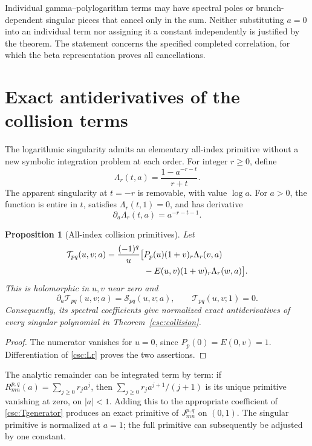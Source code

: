 \documentclass[11pt,a4paper]{article}
\numberwithin{equation}{section}
\newtheorem{proposition}[theorem]{Proposition}
\theoremstyle{definition}
\begin{document}
Individual gamma--polylogarithm terms may have spectral poles or branch-dependent singular pieces that cancel only in the sum. Neither substituting $a=0$ into an individual term nor assigning it a constant independently is justified by the theorem. The statement concerns the specified completed correlation, for which the beta representation proves all cancellations.

\section{Exact antiderivatives of the collision terms}\label{csc:antiderivatives}
The logarithmic singularity admits an elementary all-index primitive without a new symbolic integration problem at each order. For integer $r\ge0$, define
\begin{equation}\label{csc:Lr}
\Lambda_r(t,a)=\frac{1-a^{-r-t}}{r+t}.
\end{equation}
The apparent singularity at $t=-r$ is removable, with value $\log a$. For $a>0$, the function is entire in $t$, satisfies $\Lambda_r(t,1)=0$, and has derivative
\[
\partial_a\Lambda_r(t,a)=a^{-r-t-1}.
\]

\begin{proposition}[All-index collision primitives]\label{csc:singprimitive}
Let
\begin{align}
\mathcal T_{pq}(u,v;a)=\frac{(-1)^q}{u}\big[&
P_p(u)(1+v)_r\Lambda_r(v,a)\notag\\
&-E(u,v)(1+w)_r\Lambda_r(w,a)\big].\label{csc:Tgenerator}
\end{align}
This is holomorphic in $u,v$ near zero and
\begin{equation}\label{csc:Tderivative}
\partial_a\mathcal T_{pq}(u,v;a)=\mathcal S_{pq}(u,v;a),\qquad
\mathcal T_{pq}(u,v;1)=0.
\end{equation}
Consequently, its spectral coefficients give normalized exact antiderivatives of every singular polynomial in Theorem~\ref{csc:collision}.
\end{proposition}
\begin{proof}
The numerator vanishes for $u=0$, since $P_p(0)=E(0,v)=1$. Differentiation of \eqref{csc:Lr} proves the two assertions.
\end{proof}
The analytic remainder can be integrated term by term: if
$R_{mn}^{p,q}(a)=\sum_{j\ge0}r_j a^j$, then
$\sum_{j\ge0}r_j a^{j+1}/(j+1)$ is its unique primitive vanishing at zero, on $|a|<1$. Adding this to the appropriate coefficient of \eqref{csc:Tgenerator} produces an exact primitive of $J_{mn}^{p,q}$ on $(0,1)$. The singular primitive is normalized at $a=1$; the full primitive can subsequently be adjusted by one constant.
\end{document}
